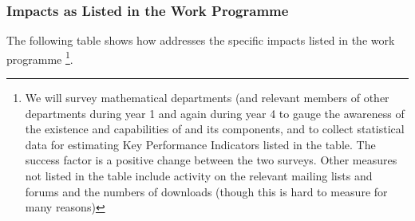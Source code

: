 \subsubsection{Impacts as Listed in the Work Programme}

The following table shows how \TheProject  addresses the specific impacts
listed in the work programme
\footnote{We will survey mathematical departments
(and relevant members of other departments 
during year 1 and again during year 4 to gauge the awareness of the 
existence and capabilities of \TheProject and its components, and to collect
statistical data for estimating Key Performance Indicators listed
in the table. The success factor is a positive change between the two surveys. 
Other measures not listed in the table include activity on the relevant mailing 
lists and forums and the numbers of downloads (though this is hard to measure 
for many reasons)}.

